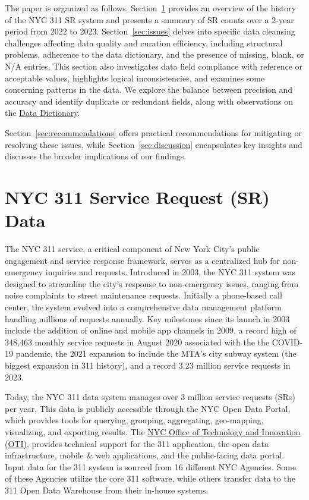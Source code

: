 \documentclass[linenumber]{jdsart}
\begin{document}
The paper is organized as follows. Section~\ref{sec:data} provides 
an overview of the history of the NYC 311 SR system and presents 
a summary of SR counts over a 2\mbox{-}year period from 2022 to 2023. 
Section~\ref{sec:issues} delves into specific data cleansing 
challenges affecting data quality and curation efficiency, 
including structural problems, adherence to the data dictionary, 
and the presence of missing, blank, or N/A entries. This section
 also investigates data field compliance with reference or acceptable values, 
highlights logical inconsistencies, and examines some concerning patterns 
in the data. We explore the balance between precision and accuracy 
and identify duplicate or redundant fields, along with observations 
on the \href{https://data.cityofnewyork.us/api/views/erm2-nwe9/files/b372b884-f86a-453b-ba16-1fe06ce9d212?download=true&filename=311_ServiceRequest_2010-Present_DataDictionary_Updated_2023.xlsx}{Data Dictionary}.

Section~\ref{sec:recommendations} offers 
practical recommendations for mitigating or resolving these issues, 
while Section~\ref{sec:discussion} encapsulates key insights and 
discusses the broader implications of our findings.


\section{NYC 311 Service Request (SR) Data} 
\label{sec:data}
The NYC 311 service, a critical component of New York City's public
engagement and service response framework, serves as a centralized hub
for non\mbox{-}emergency inquiries and requests. Introduced in 2003, the NYC
311 system was designed to streamline the city's response to
non\mbox{-}emergency issues, ranging from noise complaints to street
maintenance requests. Initially a phone\mbox{-}based call center, the system
evolved into a comprehensive data management platform handling
millions of requests annually. Key milestones since its launch in 2003
include the addition of online and mobile app channels in 2009, a
record high of 348,463 monthly service requests in August 2020 associated 
with the the COVID\mbox{-}19 pandemic, the 2021 expansion 
to include the MTA's city subway system (the biggest 
expansion in 311  history), and a record 3.23 million 
service requests in 2023. 

Today, the NYC 311 data system manages over 3 million service
requests (SRs) per year. This data is publicly accessible through the NYC Open Data
Portal, which provides tools for querying, grouping, aggregating,
geo\mbox{-}mapping, visualizing, and exporting results. The
\href{https://www.nyc.gov/content/oti/pages/}{NYC Office of Technology 
and Innovation (OTI)}, provides technical support for 
the 311 application, the open data infrastructure, mobile \& web applications, 
and the public\mbox{-}facing data portal. Input data for the 311 system 
is sourced from 16 different NYC Agencies. Some of these Agencies
utilize the core 311 software, while others transfer data to the
311 Open Data Warehouse from their in\mbox{-}house systems.
\end{document}

